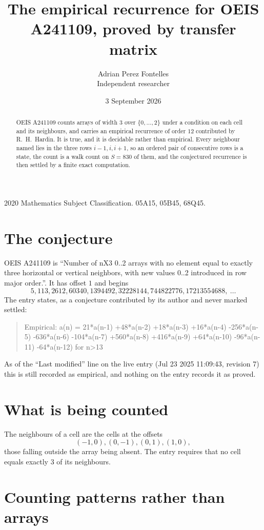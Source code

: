 \documentclass[11pt,a4paper]{article}
\title{The empirical recurrence for OEIS A241109, proved by transfer matrix}
\author{Adrian Perez Fontelles\\ \small Independent researcher}
\date{3 September 2026}
\theoremstyle{plain}
\theoremstyle{definition}
\begin{document}
\maketitle

\begin{abstract}
OEIS A241109 counts arrays of width $3$ over $\{0,\dots,2\}$ under a condition on each cell
and its neighbours, and carries an empirical recurrence of order $12$ contributed by
R.~H.~Hardin. It is true, and it is decidable rather than empirical. Every neighbour named lies
in the three rows $i-1,i,i+1$, so an ordered pair of consecutive rows is a state, the count is
a walk count on $S=830$ of them, and the conjectured recurrence is then settled by a finite
exact computation.
\end{abstract}

\noindent\small 2020 Mathematics Subject Classification. 05A15, 05B45, 68Q45.\normalsize

\section{The conjecture}

OEIS A241109 is ``Number of nX3 0..2 arrays with no element equal to exactly three horizontal or vertical neighbors, with new values 0..2 introduced in row major order.''. It has offset $1$ and begins
\[
5, 113, 2612, 60340, 1394492, 32228144, 744822776, 17213554688,\ \dots
\]
The entry states, as a conjecture contributed by its author and never marked settled:
\begin{quote}
Empirical: a(n) = 21*a(n-1) +48*a(n-2) +18*a(n-3) +16*a(n-4) -256*a(n-5) -636*a(n-6) -104*a(n-7) +560*a(n-8) +416*a(n-9) +64*a(n-10) -96*a(n-11) -64*a(n-12) for n>13
\end{quote}
As of the ``Last modified'' line on the live entry (Jul 23 2025 11:09:43, revision 7) this is still
recorded as empirical, and nothing on the entry records it as proved.

\section{What is being counted}

The neighbours of a cell are the cells at the offsets
\[
(-1,0), (0,-1), (0,1), (1,0),
\]
those falling outside the array being absent. The entry requires that no cell equals exactly $3$ of its neighbours.

\section{Counting patterns rather than arrays}
\end{document}

